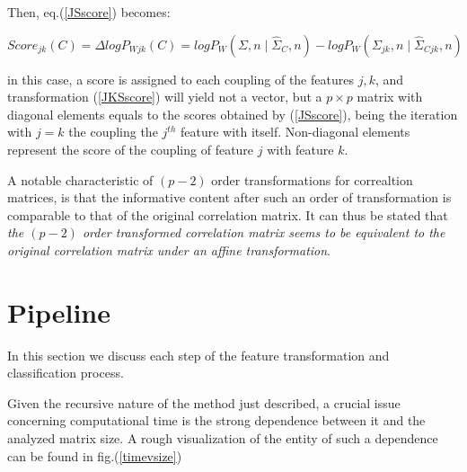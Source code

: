 \documentclass[12pt,openright,twoside,a4paper]{book}
\begin{document}
Then, eq.(\ref{JSscore}) becomes:

\begin{equation}
Score_{jk}(C)=\Delta logP_{Wjk}(C)=logP_W(\Sigma, n \mid \hat{\Sigma}_C,n)-logP_W(\Sigma_{jk}, n \mid \hat{\Sigma}_{Cjk},n)
\label{JKSscore}
\end{equation}
\vspace{5mm}

in this case, a score is assigned to each coupling of the features $j,k$, and transformation (\ref{JKSscore}) will yield not a vector, but a $p\times p$ matrix with diagonal elements equals to the scores obtained by (\ref{JSscore}), being the iteration with $j=k$ the coupling the $j^{th}$ feature with itself. 
Non-diagonal elements represent the score of the coupling of feature $j$ with feature $k$.

A notable characteristic of $(p-2)$ order transformations for correaltion matrices, is that the informative content after such an order of transformation is comparable to that of the original correlation matrix.
It can thus be stated that \textit{the $(p-2)$ order transformed correlation matrix seems to be equivalent to the original correlation matrix under an affine transformation}.


\section{Pipeline}

In this section we discuss each step of the feature transformation and classification process.

Given the recursive nature of the method just described, a crucial issue concerning computational time is the strong dependence between it and the analyzed matrix size.
A rough visualization of the entity of  such a dependence can be found in fig.(\ref{timevsize})
\end{document}
